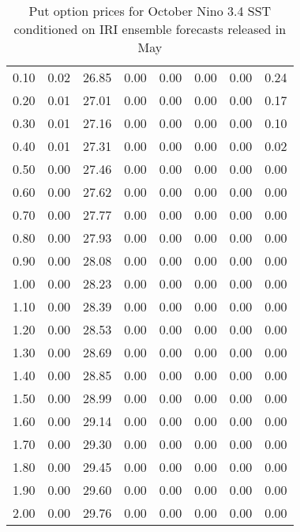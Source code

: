 \begin{table*}[ht]
\begin{tabular}{rrrrrrrr}
  0.10 & 0.02 & 26.85 & 0.00 & 0.00 & 0.00 & 0.00 & 0.24 \\ 
  0.20 & 0.01 & 27.01 & 0.00 & 0.00 & 0.00 & 0.00 & 0.17 \\ 
  0.30 & 0.01 & 27.16 & 0.00 & 0.00 & 0.00 & 0.00 & 0.10 \\ 
  0.40 & 0.01 & 27.31 & 0.00 & 0.00 & 0.00 & 0.00 & 0.02 \\ 
  0.50 & 0.00 & 27.46 & 0.00 & 0.00 & 0.00 & 0.00 & 0.00 \\ 
  0.60 & 0.00 & 27.62 & 0.00 & 0.00 & 0.00 & 0.00 & 0.00 \\ 
  0.70 & 0.00 & 27.77 & 0.00 & 0.00 & 0.00 & 0.00 & 0.00 \\ 
  0.80 & 0.00 & 27.93 & 0.00 & 0.00 & 0.00 & 0.00 & 0.00 \\ 
  0.90 & 0.00 & 28.08 & 0.00 & 0.00 & 0.00 & 0.00 & 0.00 \\ 
  1.00 & 0.00 & 28.23 & 0.00 & 0.00 & 0.00 & 0.00 & 0.00 \\ 
  1.10 & 0.00 & 28.39 & 0.00 & 0.00 & 0.00 & 0.00 & 0.00 \\ 
  1.20 & 0.00 & 28.53 & 0.00 & 0.00 & 0.00 & 0.00 & 0.00 \\ 
  1.30 & 0.00 & 28.69 & 0.00 & 0.00 & 0.00 & 0.00 & 0.00 \\ 
  1.40 & 0.00 & 28.85 & 0.00 & 0.00 & 0.00 & 0.00 & 0.00 \\ 
  1.50 & 0.00 & 28.99 & 0.00 & 0.00 & 0.00 & 0.00 & 0.00 \\ 
  1.60 & 0.00 & 29.14 & 0.00 & 0.00 & 0.00 & 0.00 & 0.00 \\ 
  1.70 & 0.00 & 29.30 & 0.00 & 0.00 & 0.00 & 0.00 & 0.00 \\ 
  1.80 & 0.00 & 29.45 & 0.00 & 0.00 & 0.00 & 0.00 & 0.00 \\ 
  1.90 & 0.00 & 29.60 & 0.00 & 0.00 & 0.00 & 0.00 & 0.00 \\ 
  2.00 & 0.00 & 29.76 & 0.00 & 0.00 & 0.00 & 0.00 & 0.00 \\ 
   \hline
\end{tabular}
\caption{Put option prices for October Nino 3.4 SST conditioned on IRI ensemble forecasts released in May} 
\end{table*}

